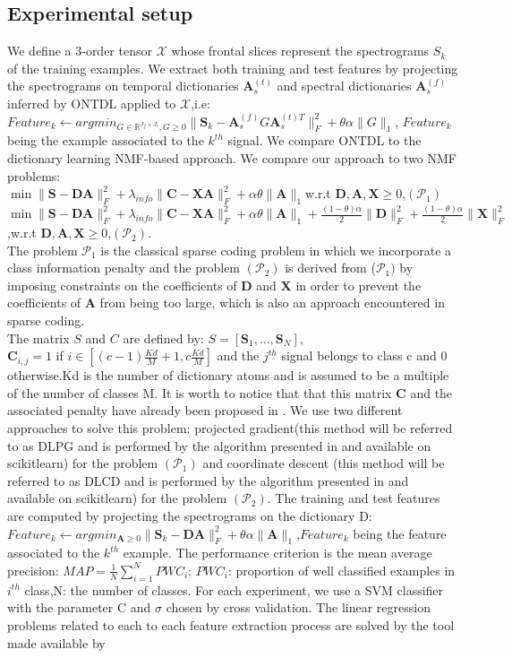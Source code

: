 \documentclass{article}
\def\tX{\boldsymbol{{\mathscr X}}}
\def\A{{\mathbf A}}
\def\S{{\mathbf S}}
\def\D{{\mathbf D}}
\def\X{{\mathbf X}}
\def\C{{\mathbf C}}
\begin{document}
\subsection{Experimental setup}
We define a 3-order tensor $\tX$ whose frontal slices represent the spectrograms $S_{k}$ of the training examples.
We extract  both training and test features by projecting the spectrograms on temporal dictionaries $\A^{(t)}_{s}$ and spectral dictionaries $\A^{(f)}_{s}$ inferred by ONTDL applied to $\tX$,i.e:\\
$Feature_{k}\leftarrow argmin_{G\in \mathbb{R}^{J_{f}\times J_{t}},G\geq 0}\|\S_{k}-\A^{(f)}_{s}G\A^{(t)T}_{s}\|^{2}_{F}+\theta\alpha\|G\|_{1}$, 
$Feature_{k}$ being the example associated to the $k^{th}$ signal. We compare ONTDL to the  dictionary learning NMF-based approach. We compare our approach to two NMF problems:\\
$\min\|\S-\D\A\|^{2}_{F}+\lambda_{info}\|\C-\X\A\|^{2}_{F}+\alpha\theta\|\A\|_{1}$w.r.t $\D,\A,\X\geq 0$,$(\mathcal{P}_{1})$\\
$\min\|\S-\D\A\|^{2}_{F}+\lambda_{info}\|\C-\X\A\|^{2}_{F}+\alpha\theta\|\A\|_{1}+\frac{(1-\theta)\alpha}{2}\|\D\|^{2}_{F}+\frac{(1-\theta)\alpha}{2}\|\X\|^{2}_{F}$,w.r.t $\D,\A,\X\geq 0$,$(\mathcal{P}_{2})$.\\
The problem $\mathcal{P}_{1}$ is the classical sparse coding problem in which we incorporate a class information penalty and the problem $(\mathcal{P}_{2})$ is derived from ($\mathcal{P}_{1})$ by imposing constraints on the coefficients of $\D$ and $\X$ in order to prevent the coefficients of $\A$ from being too large, which is also an approach encountered in sparse coding.\\ 
The matrix $S$ and $C$ are defined by:
$S=[\S_{1},...,\S_{N}]$,\\
$\C_{i,j}=1$ if $i\in [(c-1)\frac{Kd}{M}+1,c\frac{Kd}{M}]$ and the $j^{th}$ signal belongs to class c and 0 otherwise.Kd is the number of dictionary atoms and is assumed to be a multiple of the number of classes M. It is worth to notice that that this matrix $\C$ and the associated penalty have already been proposed in \cite{Classinformation}. We use two different approaches to solve this problem: projected gradient(this method will be referred to as DLPG and is performed by the algorithm presented in \cite{PGD} and available on scikitlearn) for the problem $(\mathcal{P}_{1})$ and
coordinate descent (this method will be referred to as DLCD and is performed by the algorithm presented in \cite{FCD} and available on scikitlearn) for the problem $(\mathcal{P}_{2})$. The training and test features are computed by projecting the spectrograms on the dictionary D:
$Feature_{k}\leftarrow argmin_{\A\geq 0}\|\S_{k}-\D\A\|^{2}_{F}+\theta\alpha\|\A\|_{1}$,$Feature_{k}$ being the feature associated to the $k^{th}$ example. 
The performance criterion is the mean average precision:
$MAP=\frac{1}{N}\sum^{N}_{i=1}PWC_{i}$; $PWC_{i}$: proportion of well classified examples in $i^{th}$ class,N: the number of classes. For each experiment, we use a SVM classifier with the parameter C and $\sigma$ chosen by cross validation. The linear regression problems related to each to each feature extraction process are solved by the tool made available by 
\end{document}
